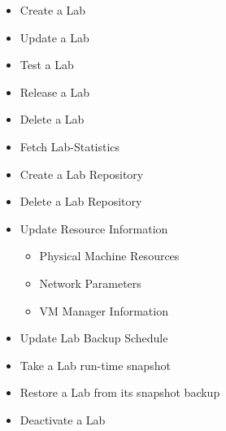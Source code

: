 \documentclass[11pt]{article}
\begin{document}
\begin{itemize}

\item Create a Lab\\
\label{sec-3.5.1.1}


\item Update a Lab\\
\label{sec-3.5.1.2}


\item Test a Lab\\
\label{sec-3.5.1.3}


\item Release a Lab\\
\label{sec-3.5.1.4}


\item Delete a Lab\\
\label{sec-3.5.1.5}


\item Fetch Lab-Statistics\\
\label{sec-3.5.1.6}


\item Create a Lab Repository\\
\label{sec-3.6.1}


\item Delete a Lab Repository\\
\label{sec-3.6.2}


\item Update Resource Information\\
\label{sec-3.6.3}

\begin{itemize}
\item Physical Machine Resources
\item Network Parameters
\item VM Manager Information
\end{itemize}

\item Update Lab Backup Schedule\\
\label{sec-3.6.4}


\item Take a Lab run-time snapshot\\
\label{sec-3.6.5}


\item Restore a Lab from its snapshot backup\\
\label{sec-3.6.6}


\item Deactivate a Lab\\
\label{sec-3.6.7}



\end{itemize}
\end{document}
